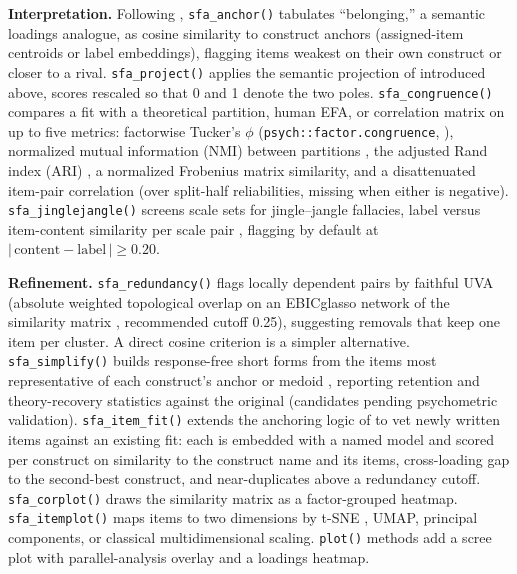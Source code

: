 \textbf{Interpretation.} Following \citet{wulff-mata-2025}, \texttt{sfa\_anchor()} tabulates ``belonging,'' a semantic loadings analogue, as cosine similarity to construct anchors (assigned-item centroids or label embeddings), flagging items weakest on their own construct or closer to a rival. \texttt{sfa\_project()} applies the semantic projection of \citet{grand-etal-2022} introduced above, scores rescaled so that 0 and 1 denote the two poles. \texttt{sfa\_congruence()} compares a fit with a theoretical partition, human EFA, or correlation matrix on up to five metrics: factorwise Tucker's $\phi$ (\texttt{psych::factor.congruence}, \citealp{revelle-2026}), normalized mutual information (NMI) between partitions \citep{golino-2026,garrido-etal-2025}, the adjusted Rand index (ARI) \citep{hubert-arabie-1985}, a normalized Frobenius matrix similarity, and a disattenuated item-pair correlation (over split-half reliabilities, missing when either is negative). \texttt{sfa\_jinglejangle()} screens scale sets for jingle--jangle fallacies, label versus item-content similarity per scale pair \citep{wulff-mata-2025,wulff-mata-2026}, flagging by default at $|\,\mathrm{content} - \mathrm{label}\,| \geq 0.20$.

\textbf{Refinement.} \texttt{sfa\_redundancy()} flags locally dependent pairs by faithful UVA \citep{christensen-etal-2023} (absolute weighted topological overlap on an EBICglasso network of the similarity matrix \citep{golino-christensen-2026}, recommended cutoff 0.25), suggesting removals that keep one item per cluster. A direct cosine criterion is a simpler alternative. \texttt{sfa\_simplify()} builds response-free short forms from the items most representative of each construct's anchor or medoid \citep{jung-seo-2025,wang-etal-2026}, reporting retention and theory-recovery statistics against the original (candidates pending psychometric validation). \texttt{sfa\_item\_fit()} extends the anchoring logic of \citet{wulff-mata-2025} to vet newly written items against an existing fit: each is embedded with a named model and scored per construct on similarity to the construct name and its items, cross-loading gap to the second-best construct, and near-duplicates above a redundancy cutoff. \texttt{sfa\_corplot()} draws the similarity matrix as a factor-grouped heatmap. \texttt{sfa\_itemplot()} maps items to two dimensions by t-SNE \citep{vandermaaten-hinton-2008}, UMAP, principal components, or classical multidimensional scaling. \texttt{plot()} methods add a scree plot with parallel-analysis overlay and a loadings heatmap.
